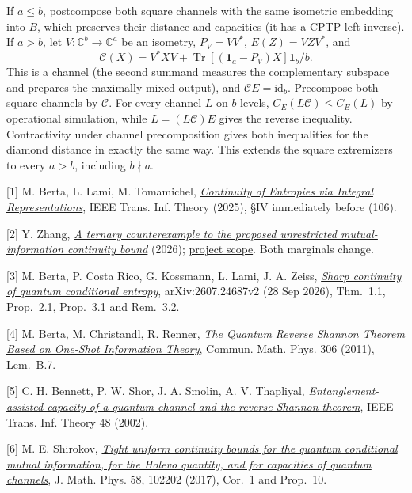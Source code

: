 \documentclass[11pt]{article}
\newcommand{\shead}[1]{\par\vspace{3pt}{\large\bfseries\sffamily\color{ink}#1}\par}
\newcommand{\Tr}{\operatorname{Tr}} \newcommand{\id}{\mathrm{id}} \newcommand{\1}{\mathbf 1}
\newcommand{\C}{\mathcal C}\newcommand{\D}{\mathcal D}\newcommand{\N}{\mathcal N}\newcommand{\M}{\mathcal M}
\begin{document}
If $a\le b$, postcompose both square channels with the same isometric embedding into $B$, which preserves their distance and capacities (it has a CPTP left inverse). If $a>b$, let $V:\mathbb C^b\to\mathbb C^a$ be an isometry, $P_V=VV^*$, $E(Z)=VZV^*$, and
\[
 \C(X)=V^*XV+\Tr[(\1_a-P_V)X]\1_b/b .
\]
This is a channel (the second summand measures the complementary subspace and prepares the maximally mixed output), and $\C E=\id_b$. Precompose both square channels by $\C$. For every channel $L$ on $b$ levels, $C_E(L\C)\le C_E(L)$ by operational simulation, while $L=(L\C)E$ gives the reverse inequality. Contractivity under channel precomposition gives both inequalities for the diamond distance in exactly the same way. This extends the square extremizers to every $a>b$, including $b\nmid a$.
\shead{References}
{\small
[1] M. Berta, L. Lami, M. Tomamichel, \href{https://arxiv.org/html/2408.15226v2#S4}{\emph{Continuity of Entropies via Integral Representations}}, IEEE Trans. Inf. Theory (2025), \S IV immediately before (106).

[2] Y. Zhang, \href{https://doi.org/10.5281/zenodo.23253944}{\emph{A ternary counterexample to the proposed unrestricted mutual-information continuity bound}} (2026); \href{https://github.com/mxym/math/blob/main/preprints/mutual-information-continuity-2026-10/README.md}{project scope}. Both marginals change.

[3] M. Berta, P. Costa Rico, G. Kossmann, L. Lami, J. A. Zeiss, \href{https://arxiv.org/html/2607.24687v2}{\emph{Sharp continuity of quantum conditional entropy}}, arXiv:2607.24687v2 (28 Sep 2026), Thm.\ 1.1, Prop.\ 2.1, Prop.\ 3.1 and Rem.\ 3.2.

[4] M. Berta, M. Christandl, R. Renner, \href{https://arxiv.org/html/0912.3805v3#A2.SS3}{\emph{The Quantum Reverse Shannon Theorem Based on One-Shot Information Theory}}, Commun. Math. Phys. 306 (2011), Lem.\ B.7.

[5] C. H. Bennett, P. W. Shor, J. A. Smolin, A. V. Thapliyal, \href{https://arxiv.org/abs/quant-ph/0106052}{\emph{Entanglement-assisted capacity of a quantum channel and the reverse Shannon theorem}}, IEEE Trans. Inf. Theory 48 (2002).

[6] M. E. Shirokov, \href{https://arxiv.org/abs/1512.09047}{\emph{Tight uniform continuity bounds for the quantum conditional mutual information, for the Holevo quantity, and for capacities of quantum channels}}, J. Math. Phys. 58, 102202 (2017), Cor.\ 1 and Prop.\ 10.}
\end{document}
